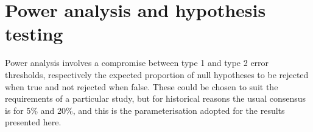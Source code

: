 

\section{Power analysis and hypothesis testing} 
Power analysis involves a compromise between type 1 and type 2 error thresholds, respectively the expected proportion of null hypotheses to be rejected when true and not rejected when false.  These could be chosen to suit the requirements of a particular study, but for historical reasons the usual consensus is for 5\% and 20\%, and this is the parameterisation adopted for the results presented here.

